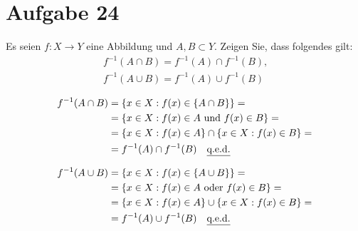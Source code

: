 \section{Aufgabe 24}
\setcounter{section}{24}

Es seien $f : X \rightarrow Y$ eine Abbildung und $A, B \subset Y$. Zeigen Sie,
dass folgendes gilt:
\begin{equation*}
    \begin{gathered}
        f^{-1}(A \cap B) = f^{-1}(A) \cap f^{-1}(B)\text{,}\\
        f^{-1}(A \cup B) = f^{-1}(A) \cup f^{-1}(B)
    \end{gathered}
\end{equation*}

\begin{equation*}
    \begin{aligned}
        f^{-1}(A \cap B) &= \{x \in X : f(x) \in \{A \cap B\}\} = \\
                         &= \{x \in X : f(x) \in A \text{ und } f(x) \in B\} = \\
                         &= \{x \in X : f(x) \in A\} \cap \{x \in X : f(x) \in B\} = \\
                         &= f^{-1}(A) \cap f^{-1}(B) \quad \text{\underline{q.e.d.}}
    \end{aligned}
\end{equation*}

\begin{equation*}
    \begin{aligned}
        f^{-1}(A \cup B) &= \{x \in X : f(x) \in \{A \cup B\}\} = \\
                         &= \{x \in X : f(x) \in A \text{ oder } f(x) \in B\} = \\
                         &= \{x \in X : f(x) \in A\} \cup \{x \in X : f(x) \in B\} = \\
                         &= f^{-1}(A) \cup f^{-1}(B) \quad \text{\underline{q.e.d.}}
    \end{aligned}
\end{equation*}
